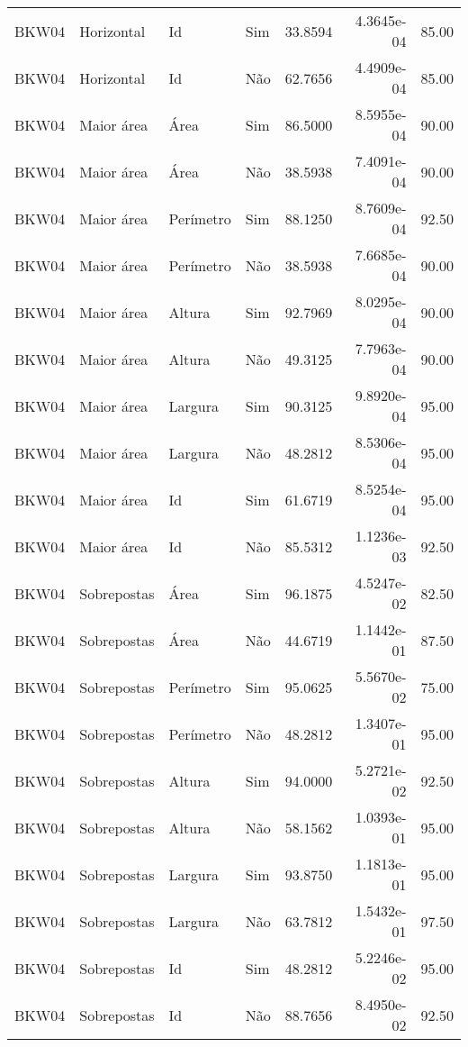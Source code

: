 \begin{tabular}{llllrrr}
    BKW04     & Horizontal  & Id        & Sim         & 33.8594      & 4.3645e-04 & 85.00    \\
    BKW04     & Horizontal  & Id        & Não         & 62.7656      & 4.4909e-04 & 85.00    \\
    BKW04     & Maior área  & Área      & Sim         & 86.5000      & 8.5955e-04 & 90.00    \\
    BKW04     & Maior área  & Área      & Não         & 38.5938      & 7.4091e-04 & 90.00    \\
    BKW04     & Maior área  & Perímetro & Sim         & 88.1250      & 8.7609e-04 & 92.50    \\
    BKW04     & Maior área  & Perímetro & Não         & 38.5938      & 7.6685e-04 & 90.00    \\
    BKW04     & Maior área  & Altura    & Sim         & 92.7969      & 8.0295e-04 & 90.00    \\
    BKW04     & Maior área  & Altura    & Não         & 49.3125      & 7.7963e-04 & 90.00    \\
    BKW04     & Maior área  & Largura   & Sim         & 90.3125      & 9.8920e-04 & 95.00    \\
    BKW04     & Maior área  & Largura   & Não         & 48.2812      & 8.5306e-04 & 95.00    \\
    BKW04     & Maior área  & Id        & Sim         & 61.6719      & 8.5254e-04 & 95.00    \\
    BKW04     & Maior área  & Id        & Não         & 85.5312      & 1.1236e-03 & 92.50    \\
    BKW04     & Sobrepostas & Área      & Sim         & 96.1875      & 4.5247e-02 & 82.50    \\
    BKW04     & Sobrepostas & Área      & Não         & 44.6719      & 1.1442e-01 & 87.50    \\
    BKW04     & Sobrepostas & Perímetro & Sim         & 95.0625      & 5.5670e-02 & 75.00    \\
    BKW04     & Sobrepostas & Perímetro & Não         & 48.2812      & 1.3407e-01 & 95.00    \\
    BKW04     & Sobrepostas & Altura    & Sim         & 94.0000      & 5.2721e-02 & 92.50    \\
    BKW04     & Sobrepostas & Altura    & Não         & 58.1562      & 1.0393e-01 & 95.00    \\
    BKW04     & Sobrepostas & Largura   & Sim         & 93.8750      & 1.1813e-01 & 95.00    \\
    BKW04     & Sobrepostas & Largura   & Não         & 63.7812      & 1.5432e-01 & 97.50    \\
    BKW04     & Sobrepostas & Id        & Sim         & 48.2812      & 5.2246e-02 & 95.00    \\
    BKW04     & Sobrepostas & Id        & Não         & 88.7656      & 8.4950e-02 & 92.50    \\
    \hline
\end{tabular}